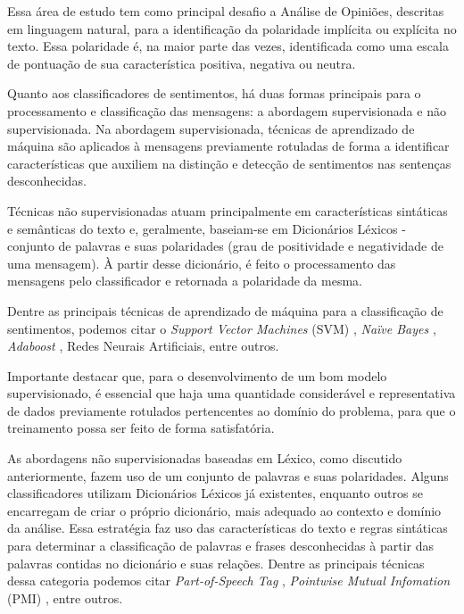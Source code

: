 \documentclass[12pt]{article}
\begin{document}
Essa área de estudo tem como principal desafio a Análise de Opiniões, descritas em linguagem natural, para a identificação da polaridade implícita ou explícita no texto. Essa polaridade é, na maior parte das vezes, identificada como uma escala de pontuação de sua característica positiva, negativa ou neutra.

Quanto aos classificadores de sentimentos, há duas formas principais para o processamento e classificação das mensagens: a abordagem supervisionada e não supervisionada. Na abordagem supervisionada, técnicas de aprendizado de máquina são aplicados à mensagens previamente rotuladas de forma a identificar características que auxiliem na distinção e detecção de sentimentos nas sentenças desconhecidas. 

Técnicas não supervisionadas atuam principalmente em características sintáticas e semânticas do texto e, geralmente, baseiam-se em Dicionários Léxicos - conjunto de palavras e suas polaridades (grau de positividade e negatividade de uma mensagem). À partir desse dicionário, é feito o processamento das mensagens pelo classificador e retornada a polaridade da mesma. \cite{araujo2013metodos}

Dentre as principais técnicas de aprendizado de máquina para a classificação de sentimentos, podemos citar o \emph{Support Vector Machines} (SVM) \cite{HADDI2013}, \emph{Naïve Bayes} \cite{Iqbal}, \emph{Adaboost} \cite{graff2017semantic}, Redes Neurais Artificiais, entre outros. \cite{Rodrigues2016}

Importante destacar que, para o desenvolvimento de um bom modelo supervisionado, é essencial que haja uma quantidade considerável e representativa de dados previamente rotulados pertencentes ao domínio do problema, para que o treinamento possa ser feito de forma satisfatória. \cite{araujo2013metodos}

As abordagens não supervisionadas baseadas em Léxico, como discutido anteriormente, fazem uso de um conjunto de palavras e suas polaridades. Alguns classificadores utilizam Dicionários Léxicos já existentes, enquanto outros se encarregam de criar o próprio dicionário, mais adequado ao contexto e domínio da análise. Essa estratégia faz uso das características do texto e regras sintáticas para determinar a classificação de palavras e frases desconhecidas à partir das palavras contidas no dicionário e suas relações. Dentre as principais técnicas dessa categoria podemos citar \emph{Part-of-Speech Tag} \cite{becker2013}, \emph{Pointwise Mutual Infomation} (PMI) \cite{Turney2002}, entre outros.
\end{document}

